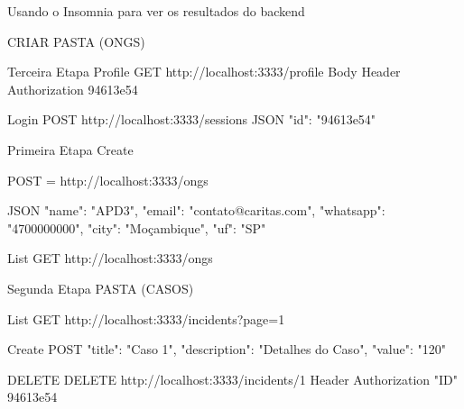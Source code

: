 Usando o Insomnia para ver os resultados do backend

CRIAR PASTA (ONGS)


Terceira Etapa
Profile
GET http://localhost:3333/profile
Body
Header Authorization  94613e54

Login
POST http://localhost:3333/sessions
JSON 
{
	"id": "94613e54"
}



Primeira Etapa
Create

POST = http://localhost:3333/ongs

JSON 
{
	"name": "APD3",
	"email": "contato@caritas.com",
	"whatsapp": "4700000000",
	"city": "Moçambique",
	"uf": "SP"
}

List
GET http://localhost:3333/ongs

Segunda Etapa
PASTA (CASOS)

List
GET http://localhost:3333/incidents?page=1

Create
POST 
{
	"title": "Caso 1",
	"description": "Detalhes do Caso",
	"value": "120"
}

DELETE
DELETE http://localhost:3333/incidents/1
Header Authorization "ID" 94613e54 

